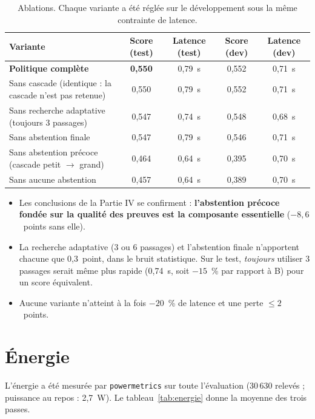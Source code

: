 \documentclass[11pt,a4paper]{article}
\begin{document}
\begin{table}[H]
\centering\small
\begin{tabularx}{\linewidth}{Y c c c c}
\toprule
Variante & Score (test) & Latence (test) & Score (dev) & Latence (dev) \\
\midrule
\textbf{Politique complète} & \textbf{0,550} & 0,79~s & 0,552 & 0,71~s \\
Sans cascade (identique : la cascade n'est pas retenue) & 0,550 & 0,79~s & 0,552 & 0,71~s \\
Sans recherche adaptative (toujours 3 passages) & 0,547 & 0,74~s & 0,548 & 0,68~s \\
Sans abstention finale & 0,547 & 0,79~s & 0,546 & 0,71~s \\
Sans abstention précoce (cascade petit $\to$ grand) & 0,464 & 0,64~s & 0,395 & 0,70~s \\
Sans aucune abstention & 0,457 & 0,64~s & 0,389 & 0,70~s \\
\bottomrule
\end{tabularx}
\caption{Ablations. Chaque variante a été réglée sur le développement sous la même contrainte de latence.}
\label{tab:ablations}
\end{table}

\begin{itemize}
\item Les conclusions de la Partie IV se confirment : \textbf{l'abstention précoce fondée sur la qualité
des preuves est la composante essentielle} ($-8{,}6$~points sans elle).
\item La recherche adaptative (3 ou 6 passages) et l'abstention finale n'apportent chacune que
0,3~point, dans le bruit statistique. Sur le test, \emph{toujours} utiliser 3 passages serait même plus
rapide (0,74~s, soit $-15$~\% par rapport à B) pour un score équivalent.
\item Aucune variante n'atteint à la fois $-20$~\% de latence et une perte $\le 2$~points.
\end{itemize}

\section{Énergie}\label{sec:energie}

L'énergie a été mesurée par \texttt{powermetrics} sur toute l'évaluation (30\,630 relevés ; puissance
au repos : 2,7~W). Le tableau~\ref{tab:energie} donne la moyenne des trois passes.
\end{document}
